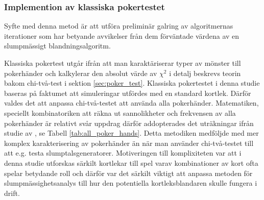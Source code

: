 \documentclass[swedish,a4paper]{article}
\begin{document}






\subsubsection{Implemention av klassiska pokertestet}
\label{sec:poker_test_M}
Syfte med denna metod är att utföra preliminär galring av algoritmernas
iterationer som har betyande avvikelser från dem förväntade värdena av en slumpmässigt
blandningsalgoritm.  

Klassiska pokertest utgår ifrån att man karaktäriserar typer av mönster
till pokerhänder och kalkylerar  den absolut värde av $\chi^2$ i detalj beskrevs
teorin bakom chi-två-test  i sektion \ref{sec:poker_test}. Klassiska pokertestet 
i denna studie baseras på faktumet att simuleringar utfördes med en
standard kortlek. Därför valdes det att anpassa chi-två-testet att använda alla
pokerhänder. Matematiken, speciellt kombinatoriken att räkna ut sannolikheter
och frekvensen av alla poker\-händer är relativt svår uppdrag därför
addopterades det uträkningar ifrån studie av \textcite{Drew2006}, se Tabell
\ref{tab:all_poker_hands}. Detta metodiken medföljde med mer komplex
karakterisering av poker\-händer än när man använder chi-två-testet till att
e.g. testa slumptalsgeneratorer. Motiveringen till komplixiteten var att i denna
studie utforskas särkilt kortlekar till spel varav kombinationer av kort ofta
spelar betydande roll och därför var det särkilt viktigt att anpassa metoden för slumpmässighetsanalys till hur den potentiella kortleksblandaren skulle
fungera i drift.
\end{document}
